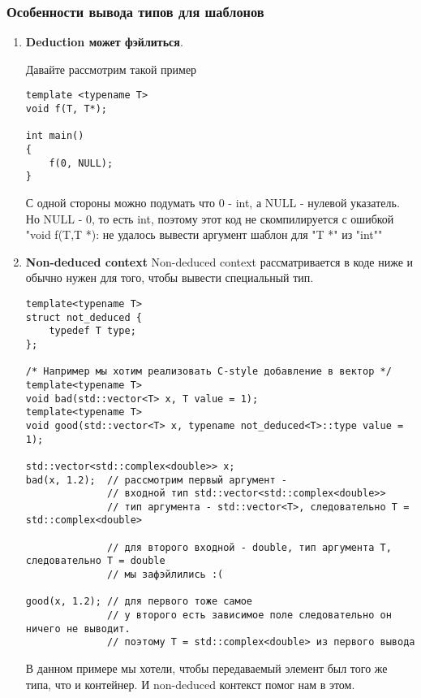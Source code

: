 		\subsubsection{Особенности вывода типов для шаблонов}
			\begin{enumerate}
				\item \textbf{Deduction может фэйлиться}.
				
				Давайте рассмотрим такой пример
\begin{verbatim}
template <typename T>
void f(T, T*);

int main()
{
	f(0, NULL);
}
				\end{verbatim}
				С одной стороны можно подумать что 0 - int, а NULL - нулевой указатель. Но NULL - 0, то есть int, поэтому этот код не скомпилируется с ошибкой "void f(T,T *): не удалось вывести аргумент шаблон для "T *" из "int""
				
				\item \textbf{Non-deduced context}
				Non-deduced context рассматривается в коде ниже и обычно нужен для того, чтобы вывести специальный тип.
\begin{verbatim}
template<typename T>
struct not_deduced {
	typedef T type;
};

/* Например мы хотим реализовать С-style добавление в вектор */
template<typename T>
void bad(std::vector<T> x, T value = 1);
template<typename T>
void good(std::vector<T> x, typename not_deduced<T>::type value = 1);

std::vector<std::complex<double>> x;
bad(x, 1.2);  // рассмотрим первый аргумент -
			  // входной тип std::vector<std::complex<double>>
			  // тип аргумента - std::vector<T>, следовательно T = std::complex<double>

			  // для второго входной - double, тип аргумента T, следовательно T = double
			  // мы зафэйлились :(

good(x, 1.2); // для первого тоже самое
			  // у второго есть зависимое поле следовательно он ничего не выводит.
			  // поэтому T = std::complex<double> из первого вывода
\end{verbatim}
				
				В данном примере мы хотели, чтобы передаваемый элемент был того же типа, что и контейнер. И non-deduced контекст помог нам в этом.
				

\end{enumerate}
